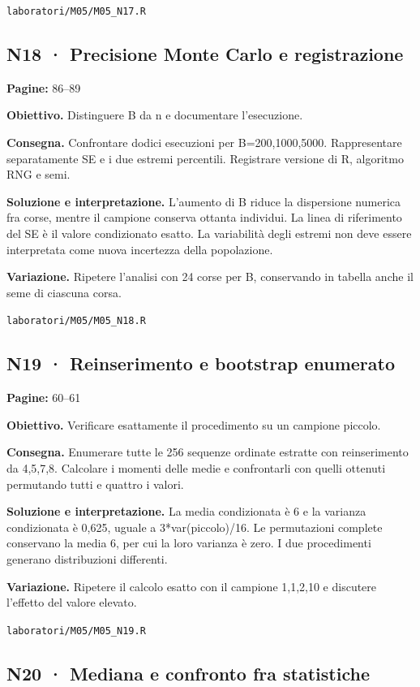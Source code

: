 \documentclass[11pt,a4paper]{article}
\begin{document}
\texttt{laboratori/M05/M05\_N17.R}

\subsection*{N18 · Precisione Monte Carlo e registrazione}

\textbf{Pagine:} 86–89

\textbf{Obiettivo.} Distinguere B da n e documentare l’esecuzione.

\textbf{Consegna.} Confrontare dodici esecuzioni per B=200,1000,5000. Rappresentare separatamente SE e i due estremi percentili. Registrare versione di R, algoritmo RNG e semi.

\textbf{Soluzione e interpretazione.} L’aumento di B riduce la dispersione numerica fra corse, mentre il campione conserva ottanta individui. La linea di riferimento del SE è il valore condizionato esatto. La variabilità degli estremi non deve essere interpretata come nuova incertezza della popolazione.

\textbf{Variazione.} Ripetere l’analisi con 24 corse per B, conservando in tabella anche il seme di ciascuna corsa.

\texttt{laboratori/M05/M05\_N18.R}

\newpage

\subsection*{N19 · Reinserimento e bootstrap enumerato}

\textbf{Pagine:} 60–61

\textbf{Obiettivo.} Verificare esattamente il procedimento su un campione piccolo.

\textbf{Consegna.} Enumerare tutte le 256 sequenze ordinate estratte con reinserimento da 4,5,7,8. Calcolare i momenti delle medie e confrontarli con quelli ottenuti permutando tutti e quattro i valori.

\textbf{Soluzione e interpretazione.} La media condizionata è 6 e la varianza condizionata è 0,625, uguale a 3*var(piccolo)/16. Le permutazioni complete conservano la media 6, per cui la loro varianza è zero. I due procedimenti generano distribuzioni differenti.

\textbf{Variazione.} Ripetere il calcolo esatto con il campione 1,1,2,10 e discutere l’effetto del valore elevato.

\texttt{laboratori/M05/M05\_N19.R}

\subsection*{N20 · Mediana e confronto fra statistiche}
\end{document}
